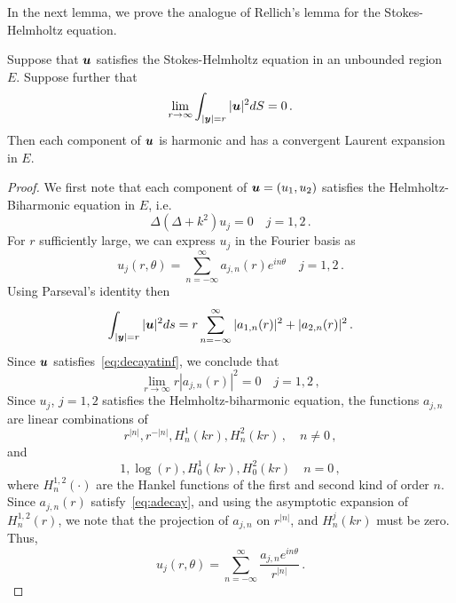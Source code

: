 In the next lemma, we prove the analogue of Rellich's lemma for the Stokes-
Helmholtz equation. 
\begin{lem}
\label{lem:rellich}
Suppose that ${\boldsymbol u}$ satisfies the Stokes-Helmholtz equation in an unbounded
region $E$.  
Suppose further that 
\begin{equation}
\lim_{r \to \infty} \int_{|{\boldsymbol y}|=r} |{\boldsymbol u}|^2 dS = 0 
\, . \label{eq:decayatinf}
\end{equation}
Then each component of ${\boldsymbol u}$ is harmonic and has a convergent Laurent
expansion in $E$.
\end{lem}
\begin{proof}
We first note that each component of ${\boldsymbol u}= (u_{1},u_{2})$ satisfies the 
Helmholtz-Biharmonic equation in $E$, i.e.
\begin{equation}
\Delta (\Delta + k^2) u_{j} = 0 \quad j=1,2 \,. 
\end{equation}
For $r$ sufficiently large, we can express $u_{j}$ in the Fourier basis as
\begin{equation}
u_{j}(r,\theta) = \sum_{n=-\infty}^{\infty} a_{j,n}(r) e^{i n \theta}  \quad 
j=1,2 \, .
\end{equation}
Using Parseval's identity then
\begin{equation}
\int_{|{\boldsymbol y}|=r} |{\boldsymbol u}|^2 ds = r\sum_{n=-\infty}^{\infty} |a_{1,n}(r)|^2  +
|a_{2,n}(r)|^2 \, .
\end{equation}
Since ${\boldsymbol u}$ satisfies~\cref{eq:decayatinf}, we conclude that
\begin{equation}
\lim_{r\to\infty} r|a_{j,n}(r)|^2 = 0 \quad j=1,2 \, , \label{eq:adecay}
\end{equation}
Since $u_{j}$, $j=1,2$ satisfies the Helmholtz-biharmonic equation,
the functions $a_{j,n}$ are linear combinations of 
\begin{equation}
r^{|n|}, r^{-|n|}, H^{1}_{n}(k r), H^{2}_{n}(k r) \, , \quad
n\neq 0 \, ,
\end{equation}
and
\begin{equation}
1, \log{(r)}, H^{1}_{0}(k r), H^{2}_{0}(k r) \quad n=0 \, , 
\end{equation} 
where $H_{n}^{1,2}(\cdot)$ are the Hankel functions of the first and
second kind of order $n$.
Since $a_{j,n}(r)$ satisfy~\cref{eq:adecay}, and using the asymptotic 
expansion of $H_{n}^{1,2}(r)$, we note that the projection of 
$a_{j,n}$ on $r^{|n|}$, and $H_{n}^{j}(k r)$ must be zero. 
Thus, 
\begin{equation}
u_{j}(r,\theta) = \sum_{n=-\infty}^{\infty} \frac{a_{j,n} e^{i n \theta}}{r^{|n|}} 
\, .
\end{equation}
\end{proof}
